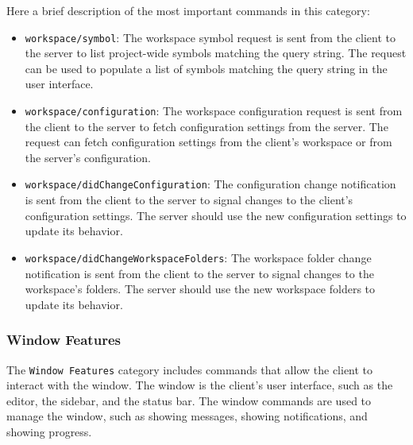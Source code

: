Here a brief description of the most important commands in this category:
\begin{itemize}
    \item \texttt{workspace/symbol}: The workspace symbol request is sent from the client to the server to list project-wide symbols matching the query string. The request can be used to populate a list of symbols matching the query string in the user interface.
    \item \texttt{workspace/configuration}: The workspace configuration request is sent from the client to the server to fetch configuration settings from the server. The request can fetch configuration settings from the client's workspace or from the server's configuration.
    \item \texttt{workspace/didChangeConfiguration}: The configuration change notification is sent from the client to the server to signal changes to the client's configuration settings. The server should use the new configuration settings to update its behavior.
    \item \texttt{workspace/didChangeWorkspaceFolders}: The workspace folder change notification is sent from the client to the server to signal changes to the workspace's folders. The server should use the new workspace folders to update its behavior.
\end{itemize}

\subsubsection{Window Features}\label{subsec:background:WindowFeatures}

The \texttt{Window Features} category includes commands that allow the client to interact with the window. The window is the client's user interface, such as the editor, the sidebar, and the status bar. The window commands are used to manage the window, such as showing messages, showing notifications, and showing progress.

